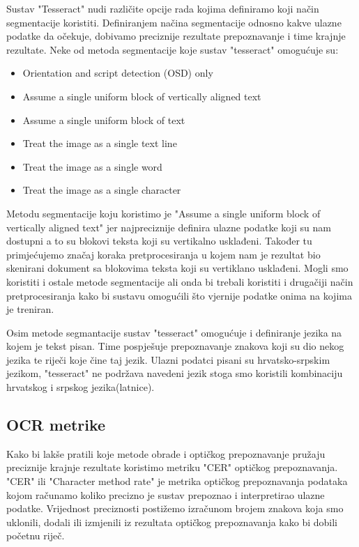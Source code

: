 \documentclass[times, utf8, zavrsni, numeric]{fer}
\begin{document}
Sustav "Tesseract" nudi različite opcije rada kojima definiramo koji način segmentacije koristiti. Definiranjem načina segmentacije odnosno kakve ulazne podatke da očekuje, dobivamo preciznije rezultate prepoznavanje i time krajnje rezultate.
Neke od metoda segmentacije koje sustav "tesseract" omogućuje su: 
\hfill \break
\begin{itemize}
  \item Orientation and script detection (OSD) only
  \item Assume a single uniform block of vertically aligned text
  \item Assume a single uniform block of text
  \item Treat the image as a single text line
  \item Treat the image as a single word
  \item Treat the image as a single character
\end{itemize}
\hfill \break
Metodu segmentacije koju koristimo je "Assume a single uniform block of vertically aligned text" jer najpreciznije definira ulazne podatke koji su nam dostupni a to su blokovi teksta koji su vertikalno usklađeni. Također tu primjećujemo značaj koraka pretprocesiranja u kojem nam je rezultat bio skenirani dokument sa blokovima teksta koji su vertiklano usklađeni. Mogli smo koristiti i ostale metode segmentacije ali onda bi trebali koristiti i drugačiji način pretprocesiranja kako bi sustavu omogućili što vjernije podatke onima na kojima je treniran.

Osim metode segmantacije sustav "tesseract" omogućuje i definiranje jezika na kojem je tekst pisan. Time pospješuje prepoznavanje znakova koji su dio nekog jezika te riječi koje čine taj jezik. Ulazni podatci pisani su hrvatsko-srpskim jezikom, "tesseract" ne podržava navedeni jezik stoga smo koristili kombinaciju hrvatskog i srpskog jezika(latnice).

\subsection{OCR metrike}
Kako bi lakše pratili koje metode obrade i optičkog prepoznavanje pružaju preciznije krajnje rezultate koristimo metriku "CER"\cite{CER} optičkog prepoznavanja. "CER" ili "Character method rate" je metrika optičkog prepoznavanja podataka kojom računamo koliko precizno je sustav prepoznao i interpretirao ulazne podatke. Vrijednost preciznosti postižemo izračunom brojem znakova koja smo uklonili, dodali ili izmjenili iz rezultata optičkog prepoznavanja kako bi dobili početnu riječ.
\end{document}
